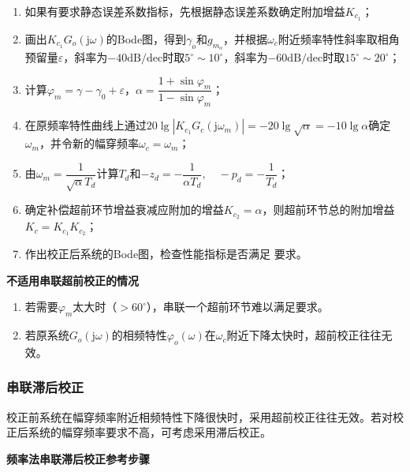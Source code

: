 \documentclass[cn, blue, normal, 12pt]{elegantnote}
\begin{document}
\begin{enumerate}
    \setlength{\itemsep}{6pt}
    \item 如果有要求静态误差系数指标，先根据静态误差系数确定附加增益$K_{c_1}$；
    \item 画出$K_{c_1}G_o(\mathrm{j}\omega)$的Bode图，得到$\gamma_o$和$g_{m_o}$，并根据$\omega_c$附近频率特性斜率取相角预留量$\varepsilon$，斜率为$-40\mathrm{dB/dec}$时取$5^{\circ}\sim 10^{\circ}$，斜率为$-60\mathrm{dB/dec}$时取$15^{\circ}\sim 20^{\circ}$；
    \item 计算$\varphi_m=\gamma-\gamma_0+\varepsilon$，$\alpha=\dfrac{1+\sin{\varphi_m}}{1-\sin{\varphi_m}}$；
    \item 在原频率特性曲线上通过$20\lg{|K_{c_1}G_c(\mathrm{j}\omega_m)|}=-20\lg{\sqrt{\alpha}}=-10\lg{\alpha}$确定$\omega_m$，并令新的幅穿频率$\omega_c=\omega_m$；
    \item 由$\omega_m=\dfrac{1}{\sqrt{\alpha}T_d}$计算$T_d$和$-z_d=-\dfrac{1}{\alpha T_d}, \quad -p_d=-\dfrac{1}{T_d}$；
    \item 确定补偿超前环节增益衰减应附加的增益$K_{c_2}=\alpha$，则超前环节总的附加增益$K_c=K_{c_1}K_{c_2}$；
    \item 作出校正后系统的Bode图，检查性能指标是否满足
    要求。
\end{enumerate}

\textbf{不适用串联超前校正的情况}

\begin{enumerate}
    \setlength{\itemsep}{6pt}
    \item 若需要$\varphi_m$太大时（$>60^{\circ}$），串联一个超前环节难以满足要求。
    \item 若原系统$G_o(\mathrm{j}\omega)$的相频特性$\varphi_o(\omega)$在$\omega_c$附近下降太快时，超前校正往往无效。
\end{enumerate}

\subsubsection{串联滞后校正}

校正前系统在幅穿频率附近相频特性下降很快时，采用超前校正往往无效。若对校正后系统的幅穿频率要求不高，可考虑采用滞后校正。

\textbf{频率法串联滞后校正参考步骤}
\end{document}
